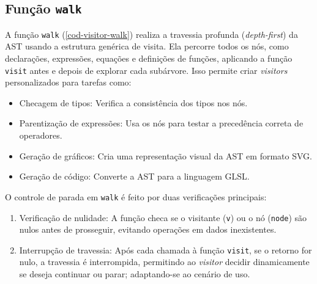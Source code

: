 \subsection{Função \texttt{walk}}
A função \texttt{walk} (\autoref{cod-visitor-walk}) realiza a travessia profunda (\textit{depth-first}) da AST usando a estrutura genérica de visita. Ela percorre todos os nós, como declarações, expressões, equações e definições de funções, aplicando a função \texttt{visit} antes e depois de explorar cada subárvore. Isso permite criar \textit{visitors} personalizados para tarefas como:

\begin{itemize}
    \item Checagem de tipos: Verifica a consistência dos tipos nos nós.
    \item Parentização de expressões: Usa os nós para testar a precedência correta de operadores.
    \item Geração de gráficos: Cria uma representação visual da AST em formato SVG.
    \item Geração de código: Converte a AST para a linguagem GLSL.
\end{itemize}

O controle de parada em \texttt{walk} é feito por duas verificações principais:

\begin{enumerate}
    \item Verificação de nulidade: A função checa se o visitante (\texttt{v}) ou o nó (\texttt{node}) são nulos antes de prosseguir, evitando operações em dados inexistentes.
    \item Interrupção de travessia: Após cada chamada à função \texttt{visit}, se o retorno for nulo, a travessia é interrompida, permitindo ao \textit{visitor} decidir dinamicamente se deseja continuar ou parar; adaptando-se ao cenário de uso.
\end{enumerate}

